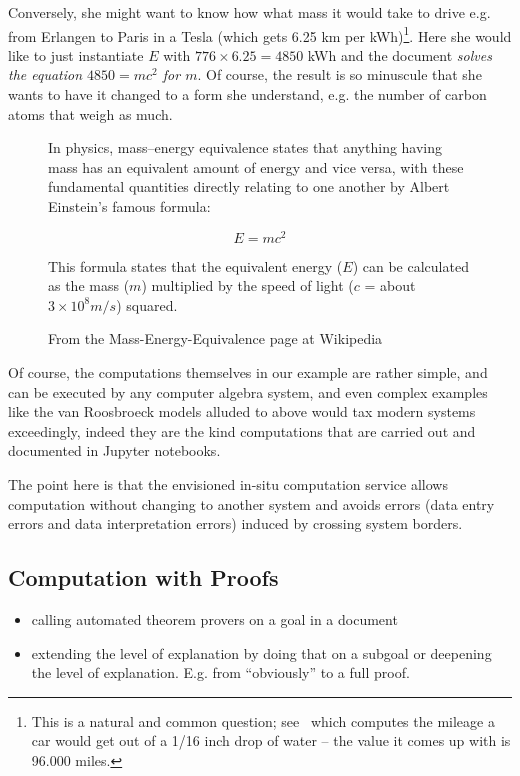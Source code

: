 Conversely, she might want to know how what mass it would take to drive e.g. from Erlangen
to Paris in a Tesla (which gets 6.25 km per kWh)\footnote{This is a natural and common
  question; see~\cite{RT:emc2} which computes the mileage a car would get out of a 1/16
  inch drop of water -- the value it comes up with is 96.000 miles.}. Here she would like
to just instantiate $E$ with $776 \times 6.25=4850$ kWh and the document \emph{solves the
  equation $4850=mc^2$ for $m$}. Of course, the result is so minuscule that she wants to have it changed to a
form she understand, e.g. the number of carbon atoms that weigh as much.

\begin{figure}\centering
  \begin{boxedquote}
    In physics, mass–energy equivalence states that anything having mass has an equivalent
    amount of energy and vice versa, with these fundamental quantities directly relating
    to one another by Albert Einstein's famous formula:

    \[E=mc^2\] 

    This formula states that the equivalent energy ($E$) can be calculated as the mass ($m$)
    multiplied by the speed of light ($c$ = about $3\times10^8 m/s$) squared.
  \end{boxedquote}
  \caption{From the Mass-Energy-Equivalence page at Wikipedia~\cite{WP:emc2}}
  \label{fig:emc2-wikipedia}
\end{figure}

Of course, the computations themselves in our example are rather simple, and can be
executed by any computer algebra system, and even complex examples like the van Roosbroeck
models alluded to above would tax modern systems exceedingly, indeed they are the kind
computations that are carried out and documented in Jupyter notebooks. 

The point here is that the envisioned in-situ computation service allows computation
without changing to another system and avoids errors (data entry errors and data
interpretation errors) induced by crossing system borders.

\subsection{Computation with Proofs}
\begin{itemize}
  \item calling automated theorem provers on a goal in a document
  \item extending the level of explanation by doing that on a subgoal or deepening the
    level of explanation. E.g. from ``obviously'' to a full proof.  
  \end{itemize}

